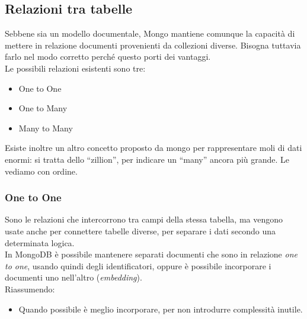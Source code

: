 \subsection{Relazioni tra tabelle}
Sebbene sia un modello documentale, Mongo mantiene comunque la capacità di mettere in relazione documenti provenienti da collezioni diverse. Bisogna tuttavia farlo nel modo corretto perché questo porti dei vantaggi.\\

\noindent Le possibili relazioni esistenti sono tre:
\begin{itemize}
    \item One to One
    \item One to Many
    \item Many to Many
\end{itemize}
Esiste inoltre un altro concetto proposto da mongo per rappresentare moli di dati enormi: si tratta dello ``zillion'', per indicare un ``many'' ancora più grande. Le vediamo con ordine.

\subsubsection{One to One}
Sono le relazioni che intercorrono tra campi della stessa tabella, ma vengono usate anche per connettere tabelle diverse, per separare i dati secondo una determinata logica.\\
In MongoDB è possibile mantenere separati documenti che sono in relazione \textit{one to one}, usando quindi degli identificatori, oppure è possibile incorporare i documenti uno nell'altro (\textit{embedding}).\\
Riassumendo:
\begin{itemize}
    \item Quando possibile è meglio incorporare, per non introdurre complessità inutile.
\end{itemize}

